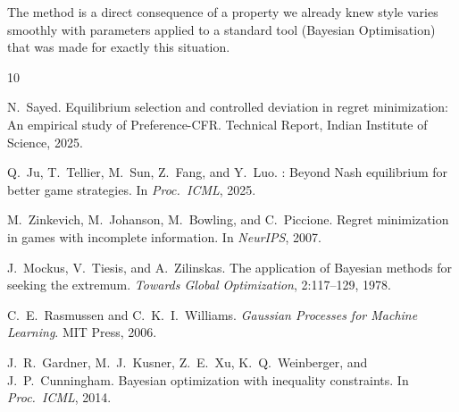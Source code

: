 \documentclass{article}
\begin{document}
The method is a direct consequence of a property we already knew style varies
smoothly with parameters applied to a standard tool (Bayesian Optimisation)
that was made for exactly this situation.


\begin{thebibliography}{10}

N.~Sayed.
\newblock Equilibrium selection and controlled deviation in regret minimization:
  An empirical study of {Preference-CFR}.
\newblock Technical Report, Indian Institute of Science, 2025.

Q.~Ju, T.~Tellier, M.~Sun, Z.~Fang, and Y.~Luo.
: Beyond {Nash} equilibrium for better game strategies.
\newblock In \emph{Proc.\ ICML}, 2025.

M.~Zinkevich, M.~Johanson, M.~Bowling, and C.~Piccione.
\newblock Regret minimization in games with incomplete information.
\newblock In \emph{NeurIPS}, 2007.

J.~Mockus, V.~Tiesis, and A.~Zilinskas.
\newblock The application of {Bayesian} methods for seeking the extremum.
\newblock \emph{Towards Global Optimization}, 2:117--129, 1978.

C.~E.~Rasmussen and C.~K.~I.~Williams.
\newblock \emph{Gaussian Processes for Machine Learning}.
\newblock MIT Press, 2006.

J.~R.~Gardner, M.~J.~Kusner, Z.~E.~Xu, K.~Q.~Weinberger, and J.~P.~Cunningham.
\newblock Bayesian optimization with inequality constraints.
\newblock In \emph{Proc.\ ICML}, 2014.

\end{thebibliography}
\end{document}
